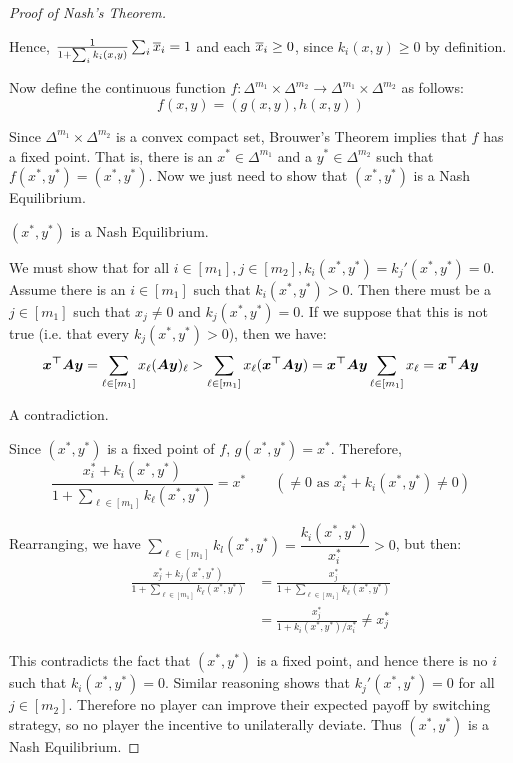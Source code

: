 \begin{proof}[Proof of Nash's Theorem]
\begin{subproof}
		Hence, $\frac{1}{1 + \sum_i k_i(x,y)} \sum_i \overline{x}_i = 1$ and
		each $\overline{x}_i \ge 0$, since $k_i(x,y) \ge 0$ by definition.
	\end{subproof}

	Now define the continuous function $f:\Delta^{m_1} \times
	\Delta^{m_2} \rightarrow \Delta^{m_1} \times \Delta^{m_2}$ as
	follows:
	\begin{equation}
		f(x,y) = (g(x,y), h(x,y))
	\end{equation}

	Since $\Delta^{m_1} \times \Delta^{m_2}$ is a convex compact set,
	Brouwer's Theorem implies that $f$ has a fixed point. That is, there is
	an $x^* \in \Delta^{m_1}$ and a $y^* \in \Delta^{m_2}$ such that
	$f(x^*,y^*) = (x^*,y^*)$. Now we just need to show that $(x^*,y^*)$ is
	a Nash Equilibrium.

	\begin{claim*}
		$(x^*, y^*)$ is a Nash Equilibrium.
	\end{claim*}
	\begin{subproof}
		We must show that for all $i \in [m_1], j \in [m_2], k_i(x^*,y^*) =
		k_j'(x^*,y^*) = 0$. Assume there is an $i \in [m_1]$ such that
		$k_i(x^*,y^*) > 0$. Then there must be a $j \in [m_1]$ such that
		$x_j \neq 0$ and $k_j(x^*, y^*) = 0$. If we suppose that this is
		not true (i.e. that every $k_j(x^*,y^*) > 0$), then we have:
		\begin{equation*}
			\bm{x^\top A y} = \sum_{\ell \in [m_1]} x_\ell
			(\bm{Ay})_\ell > \sum_{\ell \in [m_1]} x_\ell (\bm{x^\top A
			y}) = \bm{x^\top A y} \sum_{\ell \in [m_1]} x_\ell =
			\bm{x^\top A y}
		\end{equation*}

		A contradiction.
	\end{subproof}

	Since $(x^*,y^*)$ is a fixed point of $f$, $g(x^*,y^*) = x^*$.
	Therefore,
	\begin{equation*}
		\frac{x^*_i + k_i(x^*, y^*)}{1 + \sum_{\ell \in [m_1]} k_\ell (x^*,
		y^*)} = x^* \qquad (\neq 0 \text{ as $x^*_i + k_i(x^*, y^*) \neq 0$})
	\end{equation*}

	Rearranging, we have $\sum_{\ell \in [m_1]} k_l(x^*, y^*) =
	\dfrac{k_i(x^*, y^*)}{x^*_i} > 0$, but then:
	\begin{equation*}
		\begin{split}
			\frac{x^*_j + k_j(x^*,y^*)}{1 + \sum_{\ell \in [m_1]} k_\ell
			(x^*, y^*)} & = \frac{x^*_j}{1 + \sum_{\ell \in [m_1]} k_\ell
			(x^*, y^*)} \\
			& = \frac{x^*_j}{1 + k_i(x^*,y^*) / x^*_i} \neq x^*_j
		\end{split}
	\end{equation*}

	This contradicts the fact that $(x^*,y^*)$ is a fixed point, and hence
	there is no $i$ such that $k_i(x^*, y^*) = 0$. Similar reasoning shows
	that $k_j'(x^*,y^*) = 0$ for all $j \in [m_2]$. Therefore no player can
	improve their expected payoff by switching strategy, so no player the
	incentive to unilaterally deviate. Thus $(x^*,y^*)$ is a Nash
	Equilibrium.
\end{proof}
